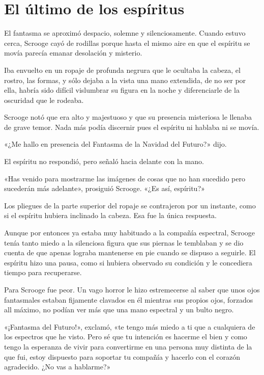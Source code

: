 \documentclass{novela}
\begin{document}

 \chapter{El último de los espíritus}



 El fantasma se aproximó despacio, solemne y silenciosamente. Cuando estuvo cerca, Scrooge cayó de rodillas porque hasta el mismo aire en que el espíritu se movía parecía emanar desolación y misterio.

 Iba envuelto en un ropaje de profunda negrura que le ocultaba la cabeza, el rostro, las formas, y sólo dejaba a la vista una mano extendida, de no ser por ella, habría sido difícil vislumbrar su figura en la noche y diferenciarle de la oscuridad que le rodeaba.

 Scrooge notó que era alto y majestuoso y que su presencia misteriosa le llenaba de grave temor. Nada más podía discernir pues el espíritu ni hablaba ni se movía.

 «¿Me hallo en presencia del Fantasma de la Navidad del Futuro?» dijo.

 El espíritu no respondió, pero señaló hacia delante con la mano.

 «Has venido para mostrarme las imágenes de cosas que no han sucedido pero sucederán más adelante», prosiguió Scrooge. «¿Es así, espíritu?»

 Los pliegues de la parte superior del ropaje se contrajeron por un instante, como si el espíritu hubiera inclinado la cabeza. Esa fue la única respuesta.

 Aunque por entonces ya estaba muy habituado a la compañía espectral, Scrooge tenía tanto miedo a la silenciosa figura que sus piernas le temblaban y se dio cuenta de que apenas lograba mantenerse en pie cuando se dispuso a seguirle. El espíritu hizo una pausa, como si hubiera observado su condición y le concediera tiempo para recuperarse.

 Para Scrooge fue peor. Un vago horror le hizo estremecerse al saber que unos ojos fantasmales estaban fijamente clavados en él mientras sus propios ojos, forzados all máximo, no podían ver más que una mano espectral y un bulto negro.

 «¡Fantasma del Futuro!», exclamó, «te tengo más miedo a ti que a cualquiera de los espectros que he visto. Pero sé que tu intención es hacerme el bien y como tengo la esperanza de vivir para convertirme en una persona muy distinta de la que fui, estoy dispuesto para soportar tu compañía y hacerlo con el corazón agradecido. ¿No vas a hablarme?»
\end{document}
